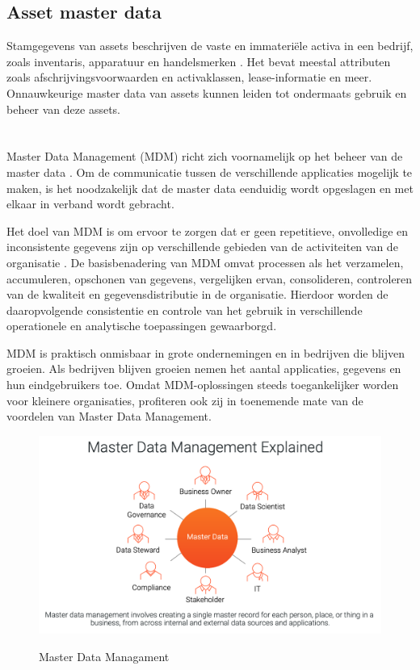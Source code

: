 \subsection{Asset master data}
Stamgegevens van assets beschrijven de vaste en immateriële activa in een bedrijf, zoals inventaris, apparatuur en handelsmerken \autocite{SAPMasterData}. Het bevat meestal attributen zoals afschrijvingsvoorwaarden en activaklassen, lease-informatie en meer. Onnauwkeurige master data van assets kunnen leiden tot ondermaats gebruik en beheer van deze assets.

\section{}%
\label{sec:mdm}
Master Data Management (MDM) richt zich voornamelijk op het beheer van de master data \autocite{Martins2022}. Om de communicatie tussen de verschillende applicaties mogelijk te maken, is het noodzakelijk dat de master data eenduidig wordt opgeslagen en met elkaar in verband wordt gebracht. 

Het doel van MDM is om ervoor te zorgen dat er geen repetitieve, onvolledige en inconsistente gegevens zijn op verschillende gebieden van de activiteiten van de organisatie \autocite{Prokhorov2018}. De basisbenadering van MDM omvat processen als het verzamelen, accumuleren, opschonen van gegevens, vergelijken ervan, consolideren, controleren van de kwaliteit en gegevensdistributie in de organisatie. Hierdoor worden de daaropvolgende consistentie en controle van het gebruik in verschillende operationele en analytische toepassingen gewaarborgd.

MDM is praktisch onmisbaar in grote ondernemingen en in bedrijven die blijven groeien. Als bedrijven blijven groeien nemen het aantal applicaties, gegevens en hun eindgebruikers toe. Omdat MDM-oplossingen steeds toegankelijker worden voor kleinere organisaties, profiteren ook zij in toenemende mate van de voordelen van Master Data Management.

\begin{figure}[htbp]
  \centering
  \includegraphics[scale=0.2]{../images/MasterData.png}
  \caption{Master Data Managament} 
  \parbox{\textwidth}{\autocite{Informatica}}
\end{figure}

